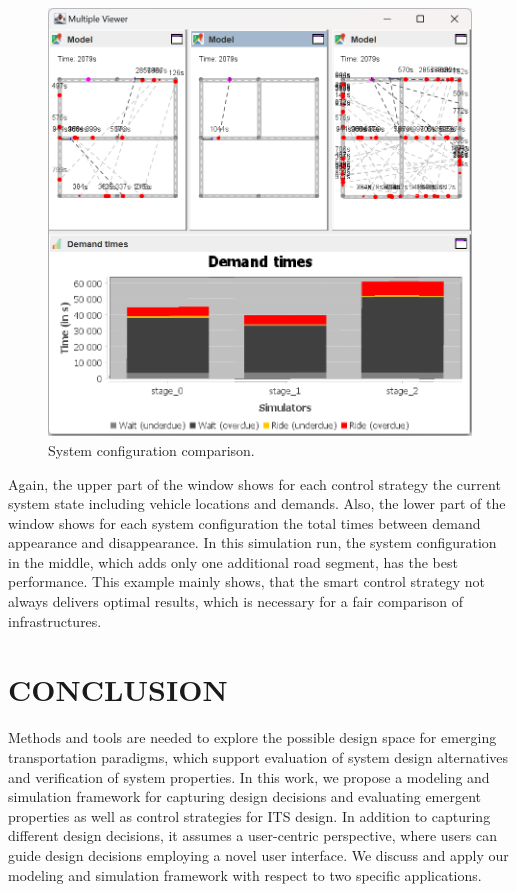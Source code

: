 \documentclass[a4paper,twoside]{article}
\begin{document}
	\begin{figure}[!ht]
		\includegraphics[width=\columnwidth]{infrastructure_comparison.png}
		\caption{System configuration comparison.}
		\label{fig:infratructure-comparison}
	\end{figure}
	
	Again, the upper part of the window shows for each control strategy the current system state including vehicle locations and demands.
	Also, the lower part of the window shows for each system configuration the total times between demand appearance and disappearance.
	In this simulation run, the system configuration in the middle, which adds only one additional road segment, has the best performance.
	This example mainly shows, that the smart control strategy not always delivers optimal results, which is necessary for a fair comparison of infrastructures.
	
	\section{\uppercase{Conclusion}}
	\label{sec:conclusion}
	
Methods and tools are needed to explore the possible design space for emerging transportation paradigms, which support evaluation of system design alternatives and verification of system properties. In this work, we propose a modeling and simulation framework for capturing design decisions and evaluating emergent properties as well as control strategies for ITS design. In addition to capturing different design decisions, it assumes a user-centric perspective, where users can guide design decisions employing a novel user interface. We discuss and apply our modeling and simulation framework with respect to two specific applications.
	
	
	
	{\small
		}
	
	
\end{document}
